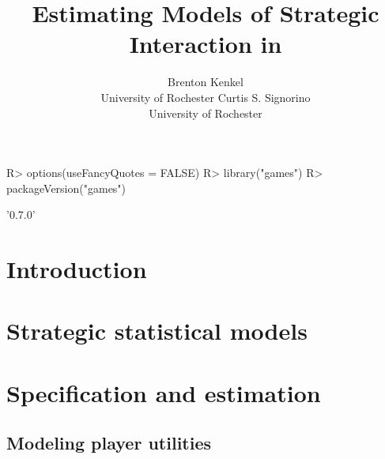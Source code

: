 \documentclass[article]{jss}
\author{Brenton Kenkel\\University of Rochester \And
  Curtis S. Signorino\\University of Rochester}
\title{Estimating Models of Strategic Interaction in \proglang{R}}
\begin{document}
\maketitle

\begin{Schunk}
\begin{Sinput}
R> options(useFancyQuotes = FALSE)
R> library("games")
R> packageVersion("games")
\end{Sinput}
\begin{Soutput}
[1] '0.7.0'
\end{Soutput}
\end{Schunk}

\section{Introduction}

 \citep{Rlang}

\section{Strategic statistical models}



\section{Specification and estimation}

\subsection{Modeling player utilities}
\end{document}
